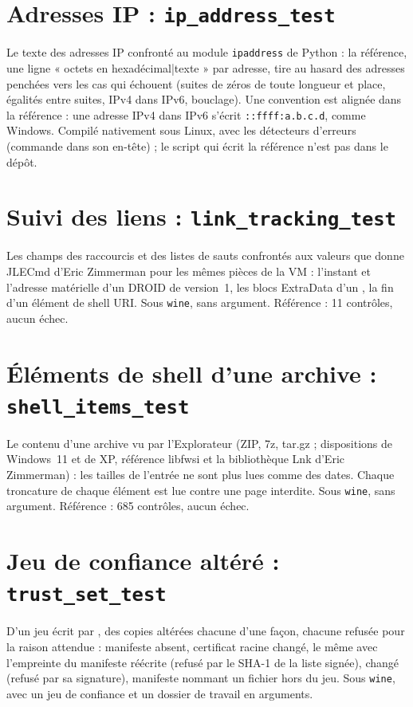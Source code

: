 \documentclass[11pt,a4paper,oneside]{report}
\begin{document}
\section{Adresses IP : \texttt{ip\_address\_test}}

Le texte des adresses IP confronté au module \texttt{ipaddress} de Python : la
référence, une ligne « octets en hexadécimal|texte » par adresse, tire au hasard
des adresses penchées vers les cas qui échouent (suites de zéros de toute
longueur et place, égalités entre suites, IPv4 dans IPv6, bouclage). Une
convention est alignée dans la référence : une adresse IPv4 dans IPv6 s'écrit
\texttt{::ffff:a.b.c.d}, comme Windows. Compilé nativement sous Linux, avec les
détecteurs d'erreurs (commande dans son en-tête) ; le script qui écrit la
référence n'est pas dans le dépôt.

\section{Suivi des liens : \texttt{link\_tracking\_test}}

Les champs des raccourcis et des listes de sauts confrontés aux valeurs que
donne JLECmd d'Eric Zimmerman pour les mêmes pièces de la VM : l'instant et
l'adresse matérielle d'un DROID de version~1, les blocs ExtraData d'un
, la fin d'un élément de shell URI. Sous \texttt{wine}, sans
argument. Référence : 11 contrôles, aucun échec.

\section{Éléments de shell d'une archive : \texttt{shell\_items\_test}}

Le contenu d'une archive vu par l'Explorateur (ZIP, 7z, tar.gz ; dispositions de
Windows~11 et de XP, référence libfwsi et la bibliothèque Lnk d'Eric Zimmerman) :
les tailles de l'entrée ne sont plus lues comme des dates. Chaque troncature de
chaque élément est lue contre une page interdite. Sous \texttt{wine}, sans
argument. Référence : 685 contrôles, aucun échec.

\section{Jeu de confiance altéré : \texttt{trust\_set\_test}}

D'un jeu écrit par , des copies altérées chacune d'une façon,
chacune refusée pour la raison attendue : manifeste absent, certificat racine
changé, le même avec l'empreinte du manifeste réécrite (refusé par le SHA-1 de la
liste signée),  changé (refusé par sa signature), manifeste
nommant un fichier hors du jeu. Sous \texttt{wine}, avec un jeu de confiance et un
dossier de travail en arguments.
\end{document}
